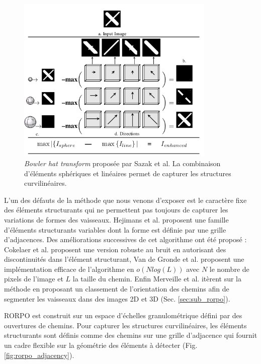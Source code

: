 \begin{figure}[h]
\centering
\includegraphics[height=8cm]{Images/bowlerHat_3D.png}
\caption{\textit{Bowler hat transform} proposée par Sazak et al. \cite{Sazak2018_bowler_hat_3D} La combinaison d'éléments sphériques et linéaires permet de capturer les structures curvilinéaires. }
\label{fig:sazak_bowler_hat}
\end{figure}

L'un des défauts de la méthode que nous venons d'exposer est le caractère fixe des éléments structurants qui ne permettent pas toujours de capturer les variations de formes des vaisseaux. Hejimans et al. \cite{Heijmans2005_path_opening} proposent une famille d'éléments structurants variables dont la forme est définie par une grille d'adjacences. Des améliorations successives de cet algorithme ont été proposé : Cokelaer et al. \cite{Cokelaer2012_efficient_path_opening} proposent une version robuste au bruit en autorisant des discontinuités dans l'élément structurant, Van de Gronde et al. \cite{Gronde2015_fast_path_opening} proposent une implémentation efficace de l'algorithme en $o( N log ( L ))$ avec $N$ le nombre de pixels de l'image et $L$ la taille du chemin. Enfin Merveille et al. \cite{Merveille2018_curvilinear} itèrent sur la méthode en proposant un classement de l'orientation des chemins afin de segmenter les vaisseaux dans des images 2D et 3D (Sec. \ref{sec:sub_rorpo}). 

\label{sec:sub_rorpo}

RORPO \cite{Merveille2018_curvilinear} est construit sur un espace d'échelles granulométrique défini par des ouvertures de chemins. Pour capturer les structures curvilinéaires, les éléments structurants sont définis comme des chemins sur une grille d'adjacence qui fournit un cadre flexible sur la géométrie des éléments à détecter (Fig. \ref{fig:rorpo_adjacency}). 

